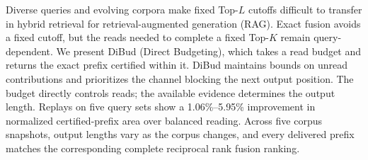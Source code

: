 Diverse queries and evolving corpora make fixed Top-$L$ cutoffs difficult to transfer in hybrid retrieval for retrieval-augmented generation (RAG). Exact fusion avoids a fixed cutoff, but the reads needed to complete a fixed Top-$K$ remain query-dependent. We present DiBud (Direct Budgeting), which takes a read budget and returns the exact prefix certified within it. DiBud maintains bounds on unread contributions and prioritizes the channel blocking the next output position. The budget directly controls reads; the available evidence determines the output length. Replays on five query sets show a 1.06\%--5.95\% improvement in normalized certified-prefix area over balanced reading. Across five corpus snapshots, output lengths vary as the corpus changes, and every delivered prefix matches the corresponding complete reciprocal rank fusion ranking.
